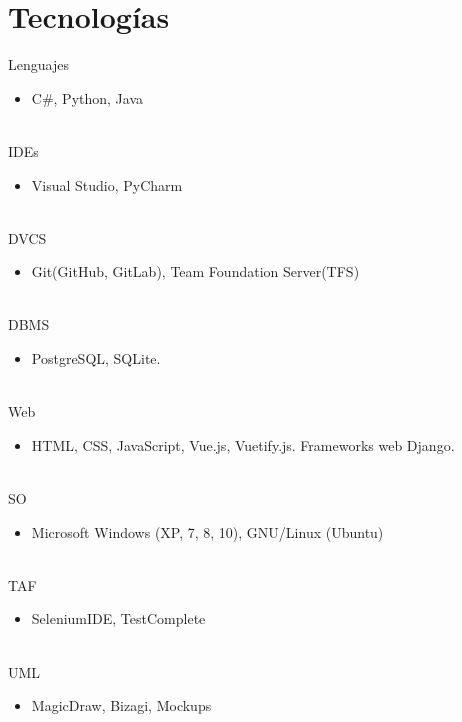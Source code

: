 \documentclass[letterpaper]{twentysecondcv} %
\begin{document}
\section{Tecnologías}
\begin{twenty}
	
	 \twentyitem
    	{Lenguajes}
		{}
        {}
        {}
        {}
        {
        {\begin{itemize}
        \item C\#, Python, Java
		\end{itemize}}
        }
        \\
	\twentyitem
    	{IDEs}
		{}
        {}
        {}
        {}
        {
        {\begin{itemize}
        \item Visual Studio, PyCharm
		\end{itemize}}
        }
        \\
        \twentyitem
    	{DVCS}
		{}
        {}
        {}
        {}
        {
        {\begin{itemize}
        \item Git(GitHub, GitLab), Team Foundation Server(TFS)
		\end{itemize}}
		}
		\\
        \twentyitem
	    {DBMS}
		{}
        {}
        {}
        {}
        {
        {\begin{itemize}
        \item PostgreSQL, SQLite.
		\end{itemize}}
		}
		\\
        \twentyitem
	    {Web}
		{}
        {}
        {}
        {}
        {
        {\begin{itemize}
        \item HTML, CSS, JavaScript, Vue.js, Vuetify.js. Frameworks web Django.
		\end{itemize}}
		}
		\\
        \twentyitem
	    {SO}
		{}
        {}
        {}
        {}
        {
        {\begin{itemize}
        \item Microsoft Windows (XP, 7, 8, 10), GNU/Linux (Ubuntu)
		\end{itemize}}
		}
		\\
        \twentyitem
	    {TAF}
		{}
        {}
        {}
        {}
        {
        {\begin{itemize}
        \item SeleniumIDE, TestComplete
		\end{itemize}}
		}
		\\
        \twentyitem
	    {UML}
		{}
        {}
        {}
        {}
        {
        {\begin{itemize}
        \item MagicDraw, Bizagi, Mockups
		\end{itemize}}
		}
\end{twenty}
\end{document}

